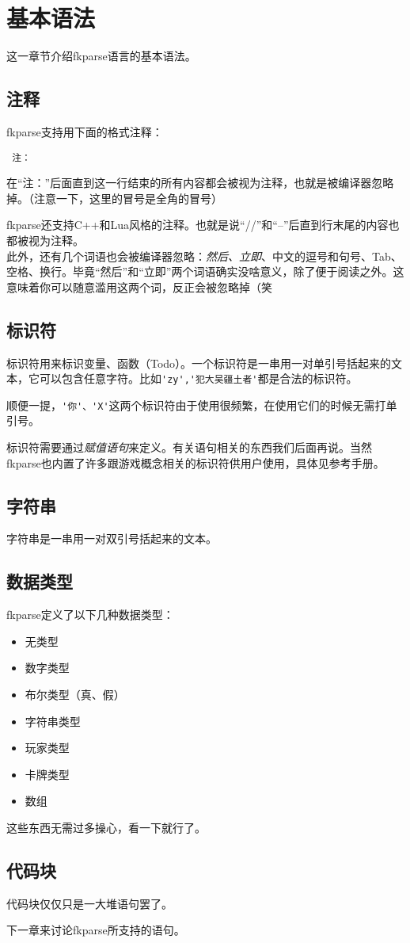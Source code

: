 \chapter{基本语法}

这一章节介绍fkparse语言的基本语法。

\section{注释}

fkparse支持用下面的格式注释：

\begin{verbatim}
 注：
\end{verbatim}

在“注：”后面直到这一行结束的所有内容都会被视为注释，也就是被编译器忽略掉。（注意一下，这里的冒号是全角的冒号）

fkparse还支持C++和Lua风格的注释。也就是说“//”和“--”后直到行末尾的内容也都被视为注释。\\

此外，还有几个词语也会被编译器忽略：\emph{然后、立即}、中文的逗号和句号、Tab、空格、换行。毕竟“然后”和“立即”两个词语确实没啥意义，除了便于阅读之外。这意味着你可以随意滥用这两个词，反正会被忽略掉（笑

\section{标识符}

标识符用来标识变量、函数（Todo）。一个标识符是一串用一对单引号括起来的文本，它可以包含任意字符。比如\verb|'zy','犯大吴疆土者'|都是合法的标识符。

顺便一提，\verb|'你'、'X'|这两个标识符由于使用很频繁，在使用它们的时候无需打单引号。

标识符需要通过\textit{赋值语句}来定义。有关语句相关的东西我们后面再说。当然fkparse也内置了许多跟游戏概念相关的标识符供用户使用，具体见参考手册。

\section{字符串}

字符串是一串用一对双引号括起来的文本。

\section{数据类型}

fkparse定义了以下几种数据类型：

\begin{itemize}
 \item 无类型
 \item 数字类型
 \item 布尔类型（真、假）
 \item 字符串类型
 \item 玩家类型
 \item 卡牌类型
 \item 数组
\end{itemize}

这些东西无需过多操心，看一下就行了。

\section{代码块}

代码块仅仅只是一大堆语句罢了。

下一章来讨论fkparse所支持的语句。


